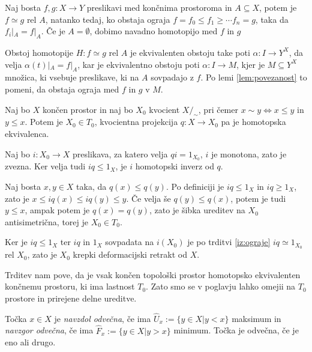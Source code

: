 \documentclass[mat1]{fmfdelo}
\begin{document}
\begin{trditev}
    Naj bosta $f,g\colon  X\rightarrow Y$ preslikavi med končnima prostoroma in $A\subseteq X$, potem je $f\simeq g$ rel $A$, natanko tedaj, ko obstaja ograja $f=f_0\leq f_1\geq  \cdots  f_n=g$, taka da $f_i|_A=f|_A$. Če je $A=\emptyset$, dobimo navadno homotopijo med $f$ in $g$
    \label{iz:ograje}
\end{trditev}

\begin{dokaz}
    Obstoj homotopije $H\colon f\simeq g$ rel $A$ je ekvivalenten obstoju take poti $\alpha\colon  I \rightarrow Y^X$, da velja $\alpha(t)|_A=f|_A$, kar je ekvivalentno obstoju poti 
    $\alpha\colon  I \rightarrow M$, kjer je $M\subseteq Y^X$ množica, ki vsebuje preslikave, ki na $A$ sovpadajo z $f$. Po lemi \ref{lem:povezanost} to pomeni, da obstaja ograja 
    med $f$ in $g$ v $M$.
\end{dokaz}


\begin{trditev}
    Naj bo $X$ končen prostor in naj bo $X_0$ kvocient $X/_\sim$, pri čemer $x\sim y \Leftrightarrow x\le y$ in $y\le x$. Potem je $X_0\in T_0$, kvocientna projekcija $q\colon X\rightarrow X_0$ pa je homotopska ekvivalenca.
\end{trditev}

\begin{dokaz}%
    Naj bo $i\colon X_0\rightarrow X$ preslikava, za katero velja $qi=1_{X_0}$, $i$ je monotona, zato je zvezna. Ker velja tudi $iq \leq 1_X$, je $i$ homotopski inverz od $q$.

    Naj bosta $x,y\in X$ taka, da $q(x)\leq q(y)$. Po definiciji je $iq \leq 1_X$ in $iq \geq 1_X$, zato je $x \leq iq(x) \leq iq(y) \leq y$. Če velja še $q(y)\leq q(x)$, potem je tudi $y\leq x$, ampak potem je $q(x)=q(y)$, zato je šibka ureditev na $X_0$ antisimetrična, torej je $X_0\in T_0$.
    
    Ker je $iq\leq 1_X$ ter $iq$ in $1_X$ sovpadata na $i(X_0)$ je po trditvi \ref{iz:ograje} 
    $iq \simeq 1_{X_0}$ rel $X_0$, zato je $X_0$ krepki deformacijski retrakt od $X$.
\end{dokaz}
    
Trditev nam pove, da je vsak končen topološki prostor homotopsko ekvivalenten končnemu prostoru, ki ima lastnost $T_0$. Zato smo se v poglavju lahko omejii na $T_0$ prostore in prirejene delne ureditve.

\begin{definicija}
    Točka $x \in X$ je \textit{navzdol odvečna}, če ima $\widehat{U}_x:=\{y\in X | y < x\}$ maksimum in \textit{navzgor odvečna}, če ima $\widehat{F}_x:=\{y\in X | y > x\}$ minimum. 
    Točka je odvečna, če je eno ali drugo.
\end{definicija}
\end{document}
